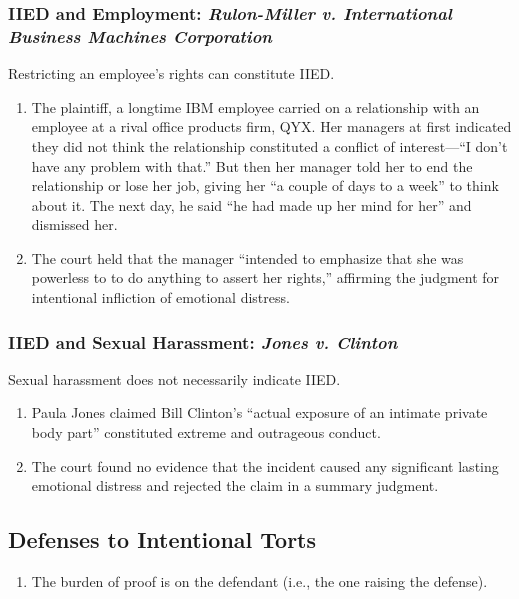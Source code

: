 \subsubsection{IIED and Employment: \emph{Rulon-Miller v. International 
Business Machines Corporation}}

Restricting an employee's rights can constitute IIED.

\begin{enumerate}
    \item The plaintiff, a longtime IBM employee carried on a relationship 
    with an employee at a rival office products firm, QYX. Her managers at 
    first indicated they did not think the relationship constituted a conflict 
    of interest---``I don't have any problem with that.'' But then her manager 
    told her to end the relationship or lose her job, giving her ``a couple of 
    days to a week'' to think about it. The next day, he said ``he had made up 
    her mind for her'' and dismissed her.
    \item The court held that the manager ``intended to emphasize that she was 
    powerless to to do anything to assert her rights,'' affirming the judgment 
    for intentional infliction of emotional distress.
\end{enumerate}

\subsubsection{IIED and Sexual Harassment: \emph{Jones v. Clinton}}

Sexual harassment does not necessarily indicate IIED.

\begin{enumerate}
    \item Paula Jones claimed Bill Clinton's ``actual exposure of an intimate 
    private body part'' constituted extreme and outrageous conduct.
    \item The court found no evidence that the incident caused any significant 
    lasting emotional distress and rejected the claim in a summary judgment.
\end{enumerate}

\subsection{Defenses to Intentional Torts}

\begin{enumerate}
    \item The burden of proof is on the defendant (i.e., the one raising the 
    defense).
\end{enumerate}


